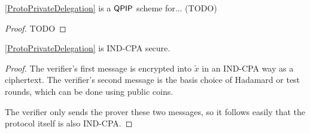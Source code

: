 \begin{thm}
	\autoref{ProtoPrivateDelegation} is a $\operatorname{\mathsf{QPIP}}$ scheme for... (TODO) 
\end{thm}
\begin{proof}
	TODO
\end{proof}

\begin{thm}
	\autoref{ProtoPrivateDelegation} is IND-CPA secure.
\end{thm}
\begin{proof}
	The verifier's first message is encrypted into $\tilde{x}$ in an IND-CPA way as a ciphertext.
	The verifier's second message is the basis choice of Hadamard or test rounds, which can be done using public coins.

	The verifier only sends the prover these two messages, so it follows  easily that the protocol itself is also IND-CPA. 
\end{proof}
